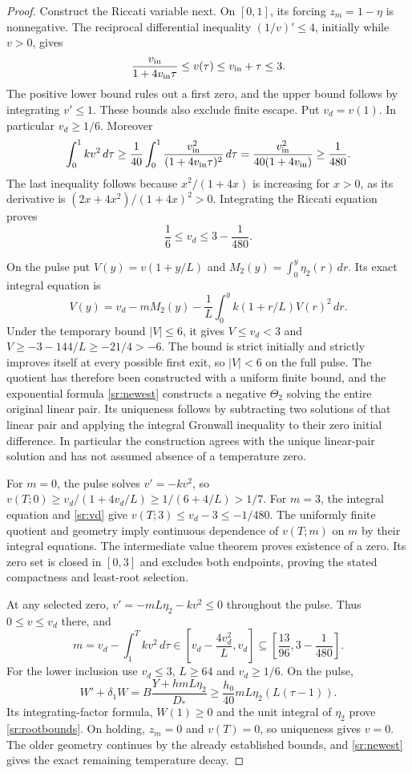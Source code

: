 \begin{proof}
Construct the Riccati variable next. On $[0,1]$, its forcing
$z_m=1-\eta$ is nonnegative. The reciprocal differential inequality
$(1/v)'\leq4$, initially while $v>0$, gives
\begin{equation}\label{sr:v-ramp}
 \frac{v_{\rm in}}{1+4v_{\rm in}\tau}
 \leq v(\tau)\leq v_{\rm in}+\tau\leq3.
\end{equation}
The positive lower bound rules out a first zero, and the upper bound
follows by integrating $v'\leq1$. These bounds also exclude finite
escape. Put $v_d=v(1)$. In particular $v_d\geq1/6$.
Moreover
\[
 \int_0^1kv^2\,d\tau
 \geq\frac1{40}\int_0^1
       \frac{v_{\rm in}^2}{(1+4v_{\rm in}\tau)^2}\,d\tau
 =\frac{v_{\rm in}^2}{40(1+4v_{\rm in})}
 \geq\frac1{480}.
\]
The last inequality follows because $x^2/(1+4x)$ is increasing
for $x>0$, as its derivative is $(2x+4x^2)/(1+4x)^2>0$.
Integrating the Riccati equation proves
\begin{equation}\label{sr:vd}
 \frac16\leq v_d\leq3-\frac1{480}.
\end{equation}

On the pulse put $V(y)=v(1+y/L)$ and
$M_2(y)=\int_0^y\eta_2(r)\,dr$. Its exact integral equation is
\[
 V(y)=v_d-mM_2(y)
       -\frac1L\int_0^y k(1+r/L)V(r)^2\,dr.
\]
Under the temporary bound $|V|\leq6$, it gives
$V\leq v_d<3$ and
$V\geq-3-144/L\geq-21/4>-6$.
The bound is strict initially and strictly improves itself at every
possible first exit, so $|V|<6$ on the full pulse. The quotient has
therefore been constructed with a uniform finite bound, and the
exponential formula \eqref{sr:newest} constructs a negative
$\Theta_2$ solving the entire original linear pair. Its uniqueness
follows by subtracting two solutions of that linear pair and applying
the integral Gronwall inequality to their zero initial difference.
In particular the construction agrees with the unique linear-pair
solution and has not assumed absence of a temperature zero.

For $m=0$, the pulse solves $v'=-kv^2$, so
$v(T;0)\geq v_d/(1+4v_d/L)\geq1/(6+4/L)>1/7$.
For $m=3$, the integral equation and \eqref{sr:vd} give
$v(T;3)\leq v_d-3\leq-1/480$.
The uniformly finite quotient and geometry imply continuous
dependence of $v(T;m)$ on $m$ by their integral equations.
The intermediate value theorem proves existence of a zero. Its
zero set is closed in $[0,3]$ and excludes both endpoints, proving
the stated compactness and least-root selection.

At any selected zero, $v'=-mL\eta_2-kv^2\leq0$ throughout
the pulse. Thus $0\leq v\leq v_d$ there, and
\[
 m=v_d-\int_1^Tkv^2\,d\tau
 \in\left[v_d-\frac{4v_d^2}{L},v_d\right]
 \subseteq\left[\frac{13}{96},3-\frac1{480}\right].
\]
For the lower inclusion use $v_d\leq3$, $L\geq64$ and
$v_d\geq1/6$. On the pulse,
\[
 W'+\delta_1W
 =B\frac{Y+hmL\eta_2}{D_*}
 \geq\frac{h_0}{40}mL\eta_2(L(\tau-1)).
\]
Its integrating-factor formula, $W(1)\geq0$ and the unit integral
of $\eta_2$ prove \eqref{sr:rootbounds}.
On holding, $z_m=0$ and $v(T)=0$, so uniqueness gives $v=0$.
The older geometry continues by the already established bounds,
and \eqref{sr:newest} gives the exact remaining temperature decay.


\end{proof}
